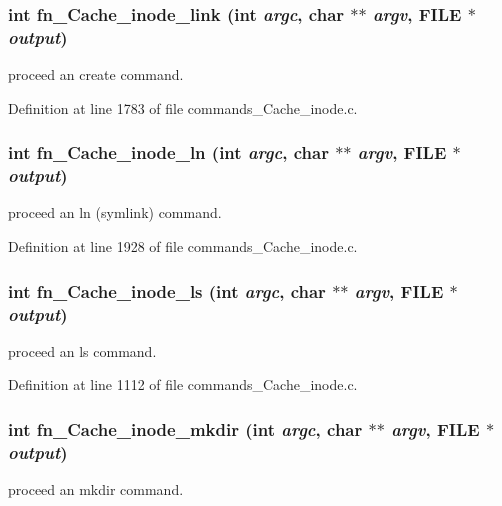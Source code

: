 \subsubsection[{fn\_\-Cache\_\-inode\_\-link}]{\setlength{\rightskip}{0pt plus 5cm}int fn\_\-Cache\_\-inode\_\-link (int {\em argc}, \/  char $\ast$$\ast$ {\em argv}, \/  FILE $\ast$ {\em output})}\label{commands__Cache__inode_8c_a29e45dc95b214393d1c59b7816f9e72d}
proceed an create command. 

Definition at line 1783 of file commands\_\-Cache\_\-inode.c.
\subsubsection[{fn\_\-Cache\_\-inode\_\-ln}]{\setlength{\rightskip}{0pt plus 5cm}int fn\_\-Cache\_\-inode\_\-ln (int {\em argc}, \/  char $\ast$$\ast$ {\em argv}, \/  FILE $\ast$ {\em output})}\label{commands__Cache__inode_8c_ada1665ad0f6c599f444cecdfe3781260}
proceed an ln (symlink) command. 

Definition at line 1928 of file commands\_\-Cache\_\-inode.c.
\subsubsection[{fn\_\-Cache\_\-inode\_\-ls}]{\setlength{\rightskip}{0pt plus 5cm}int fn\_\-Cache\_\-inode\_\-ls (int {\em argc}, \/  char $\ast$$\ast$ {\em argv}, \/  FILE $\ast$ {\em output})}\label{commands__Cache__inode_8c_a2ba98a95ea4426bf580d55f4dacab3b7}
proceed an ls command. 

Definition at line 1112 of file commands\_\-Cache\_\-inode.c.
\subsubsection[{fn\_\-Cache\_\-inode\_\-mkdir}]{\setlength{\rightskip}{0pt plus 5cm}int fn\_\-Cache\_\-inode\_\-mkdir (int {\em argc}, \/  char $\ast$$\ast$ {\em argv}, \/  FILE $\ast$ {\em output})}\label{commands__Cache__inode_8c_a9230f34cda91d77f51bb32b5acf2b4ae}
proceed an mkdir command. 

